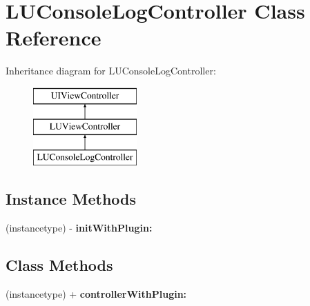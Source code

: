\hypertarget{interface_l_u_console_log_controller}{}\section{L\+U\+Console\+Log\+Controller Class Reference}
\label{interface_l_u_console_log_controller}
Inheritance diagram for L\+U\+Console\+Log\+Controller\+:\begin{figure}[H]
\begin{center}
\leavevmode
\includegraphics[height=3.000000cm]{interface_l_u_console_log_controller}
\end{center}
\end{figure}
\subsection*{Instance Methods}
\begin{DoxyCompactItemize}
\item 
\mbox{\label{interface_l_u_console_log_controller_ad0ab7e3eda7f036d7e6852949fa9ab37}} 
(instancetype) -\/ {\bfseries init\+With\+Plugin\+:}
\end{DoxyCompactItemize}
\subsection*{Class Methods}
\begin{DoxyCompactItemize}
\item 
\mbox{\label{interface_l_u_console_log_controller_a2441c64ade0d837530ed627701769513}} 
(instancetype) + {\bfseries controller\+With\+Plugin\+:}
\end{DoxyCompactItemize}
